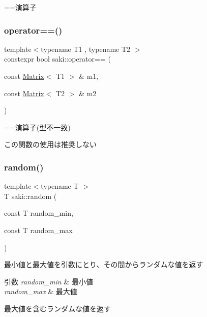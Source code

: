 ==演算子 

\mbox{\label{namespacesaki_a57ebf9c4b637e0dff3c957a7b4786332}} 
\subsubsection{\texorpdfstring{operator==()}{operator==()}\hspace{0.1cm}{\footnotesize\ttfamily [11/11]}}
{\footnotesize\ttfamily template$<$typename T1 , typename T2 $>$ \\
constexpr bool saki\+::operator== (\begin{DoxyParamCaption}\item[{const \mbox{\hyperlink{classsaki_1_1_matrix}{Matrix}}$<$ T1 $>$ \&}]{m1,  }\item[{const \mbox{\hyperlink{classsaki_1_1_matrix}{Matrix}}$<$ T2 $>$ \&}]{m2 }\end{DoxyParamCaption})}



==演算子(型不一致) 

この関数の使用は推奨しない \mbox{\label{namespacesaki_a636caf16f2f00cb734cc867646ac233f}} 
\subsubsection{\texorpdfstring{random()}{random()}}
{\footnotesize\ttfamily template$<$typename T $>$ \\
T saki\+::random (\begin{DoxyParamCaption}\item[{const T}]{random\+\_\+min,  }\item[{const T}]{random\+\_\+max }\end{DoxyParamCaption})}



最小値と最大値を引数にとり、その間からランダムな値を返す 


\begin{DoxyParams}{引数}
{\em random\+\_\+min} & 最小値 \\
\hline
{\em random\+\_\+max} & 最大値\\
\hline
\end{DoxyParams}
最大値を含むランダムな値を返す \mbox{\label{namespacesaki_aa5a82a930469f18d700db4d93b59a7e5}} 
